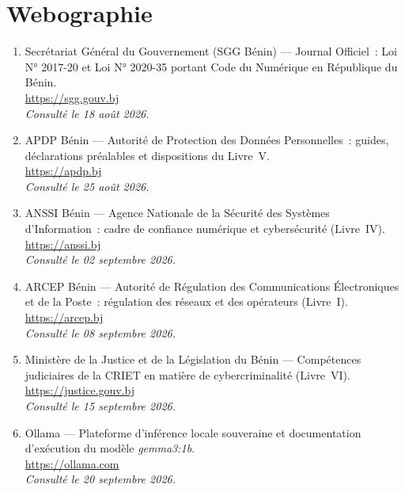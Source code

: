 \chapter*{Webographie}

\begin{enumerate}


  \item Secrétariat Général du Gouvernement (SGG Bénin) — Journal Officiel~: Loi N° 2017-20 et Loi N° 2020-35 portant Code du Numérique en République du Bénin.\\
        \url{https://sgg.gouv.bj}\\
        \textit{Consulté le 18 août 2026.}

  \item APDP Bénin — Autorité de Protection des Données Personnelles~: guides, déclarations préalables et dispositions du Livre~V.\\
        \url{https://apdp.bj}\\
        \textit{Consulté le 25 août 2026.}

  \item ANSSI Bénin — Agence Nationale de la Sécurité des Systèmes d'Information~: cadre de confiance numérique et cybersécurité (Livre~IV).\\
        \url{https://anssi.bj}\\
        \textit{Consulté le 02 septembre 2026.}

  \item ARCEP Bénin — Autorité de Régulation des Communications Électroniques et de la Poste~: régulation des réseaux et des opérateurs (Livre~I).\\
        \url{https://arcep.bj}\\
        \textit{Consulté le 08 septembre 2026.}

  \item Ministère de la Justice et de la Législation du Bénin — Compétences judiciaires de la CRIET en matière de cybercriminalité (Livre~VI).\\
        \url{https://justice.gouv.bj}\\
        \textit{Consulté le 15 septembre 2026.}


  \item Ollama — Plateforme d'inférence locale souveraine et documentation d'exécution du modèle \textit{gemma3:1b}.\\
        \url{https://ollama.com}\\
        \textit{Consulté le 20 septembre 2026.}


\end{enumerate}
